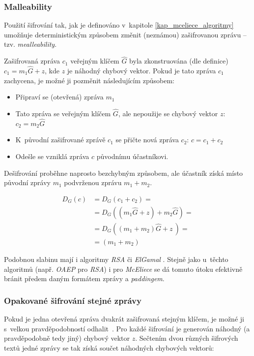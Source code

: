 \documentclass[thesis=M,czech,hidelinks]{FITthesis}[2012/06/26]
\newcommand{\0}{{\textcolor[gray]{0.80}{0}}}
\begin{document}
\subsubsection{Malleability}
Použití šifrování tak, jak je definováno v~kapitole \ref{kap_mceliece_algoritmy}
umožňuje deterministickým způsobem změnit (neznámou) zašifrovanou zprávu -- tzv.
\emph{mealleability}.

Zašifrovaná zpráva $c_1$ veřejným klíčem $\hat{G}$ byla zkonstruována (dle
definice) $c_1 = m_1\hat{G} + z$, kde $z$ je náhodný chybový vektor. Pokud
je tato zpráva $c_1$ zachycena, je možné ji pozměnit následujícím způsobem:

\begin{itemize}
    \item Připraví se (otevřená) zpráva $m_1$
    \item Tato zpráva se  veřejným klíčem $\hat{G}$, ale nepoužije
        se chybový vektor $z$: $c_2 = m_2\hat{G}$
    \item K~původní zašifrované zprávě $c_1$ se přičte nová zpráva $c_2$:
        $c = c_1 + c_2$
    \item Odešle se vzniklá zpráva $c$ původnímu účastníkovi.
\end{itemize}

Dešifrování proběhne naprosto bezchybným způsobem, ale účastník získá
místo původní zprávy $m_1$ podvrženou zprávu $m_1+m_2$.

\begin{align*}
    D_G\left(c\right) &= D_G\left( c_1 + c_2 \right) = \\
                      &= D_G\left( (m_1\hat{G} + z) + m_2\hat{G} \right) = \\
                      &= D_G\left( (m_1+m_2)\hat{G} + z~\right) =\\
                      &= (m_1+m_2)
\end{align*}

Podobnou slabinu mají i algoritmy \emph{RSA} či \emph{ElGamal} \cite{FIT_KRY}. Stejně jako
u~těchto algoritmů (např. \emph{OAEP} pro \emph{RSA}) i pro \emph{McEliece} se
dá tomuto útoku efektivně bránit předem daným formátem zprávy a
\emph{paddingem}.

\subsubsection{Opakované šifrování stejné zprávy}
Pokud je jedna otevřená zpráva dvakrát zašifrovaná stejným klíčem, je možné ji
s~velkou pravděpodobností odhalit~\cite{Berson}. Pro každé šifrování je
generován náhodný (a pravděpodobně tedy jiný) chybový vektor $z$. Sečtením dvou
různých šifrových textů jedné zprávy se tak získá součet náhodných chybových
vektorů:
\end{document}
